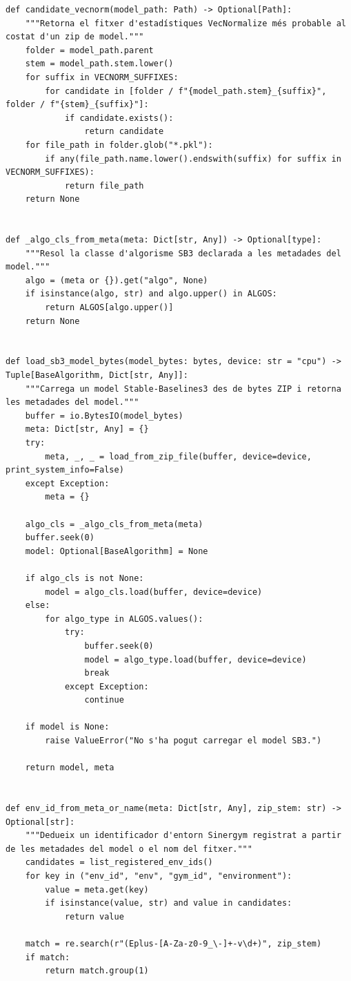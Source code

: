 \documentclass[10pt,a4paper]{article}
\begin{document}
\begin{lstlisting}[style=studioPython,caption={backend/sb3\_utils.py},label={lst:backend-sb3-utils-py}]
def candidate_vecnorm(model_path: Path) -> Optional[Path]:
    """Retorna el fitxer d'estadístiques VecNormalize més probable al costat d'un zip de model."""
    folder = model_path.parent
    stem = model_path.stem.lower()
    for suffix in VECNORM_SUFFIXES:
        for candidate in [folder / f"{model_path.stem}_{suffix}", folder / f"{stem}_{suffix}"]:
            if candidate.exists():
                return candidate
    for file_path in folder.glob("*.pkl"):
        if any(file_path.name.lower().endswith(suffix) for suffix in VECNORM_SUFFIXES):
            return file_path
    return None


def _algo_cls_from_meta(meta: Dict[str, Any]) -> Optional[type]:
    """Resol la classe d'algorisme SB3 declarada a les metadades del model."""
    algo = (meta or {}).get("algo", None)
    if isinstance(algo, str) and algo.upper() in ALGOS:
        return ALGOS[algo.upper()]
    return None


def load_sb3_model_bytes(model_bytes: bytes, device: str = "cpu") -> Tuple[BaseAlgorithm, Dict[str, Any]]:
    """Carrega un model Stable-Baselines3 des de bytes ZIP i retorna les metadades del model."""
    buffer = io.BytesIO(model_bytes)
    meta: Dict[str, Any] = {}
    try:
        meta, _, _ = load_from_zip_file(buffer, device=device, print_system_info=False)
    except Exception:
        meta = {}

    algo_cls = _algo_cls_from_meta(meta)
    buffer.seek(0)
    model: Optional[BaseAlgorithm] = None

    if algo_cls is not None:
        model = algo_cls.load(buffer, device=device)
    else:
        for algo_type in ALGOS.values():
            try:
                buffer.seek(0)
                model = algo_type.load(buffer, device=device)
                break
            except Exception:
                continue

    if model is None:
        raise ValueError("No s'ha pogut carregar el model SB3.")

    return model, meta


def env_id_from_meta_or_name(meta: Dict[str, Any], zip_stem: str) -> Optional[str]:
    """Dedueix un identificador d'entorn Sinergym registrat a partir de les metadades del model o el nom del fitxer."""
    candidates = list_registered_env_ids()
    for key in ("env_id", "env", "gym_id", "environment"):
        value = meta.get(key)
        if isinstance(value, str) and value in candidates:
            return value

    match = re.search(r"(Eplus-[A-Za-z0-9_\-]+-v\d+)", zip_stem)
    if match:
        return match.group(1)


\end{lstlisting}
\end{document}
